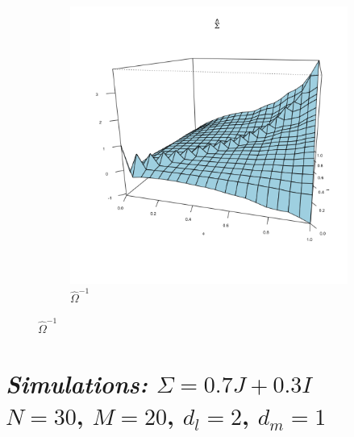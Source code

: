 \documentclass[12pt]{article}
\theoremstyle{definition}
\begin{document}
\begin{center}
\begin{figure}[H]
\begin{subfigure}{.48\textwidth}
 \includegraphics{img/linear-vc-model-estimated-covariance}
 \caption{$\hat{\Omega}^{-1}$}
 \end{subfigure}
 \end{figure}
     \end{center}


 



 
\section{\emph{Simulations: }$\Sigma = 0.7J + 0.3I$\\
$N = 30$, $M=20$, $d_l = 2$, $d_m= 1$}
\end{document}
